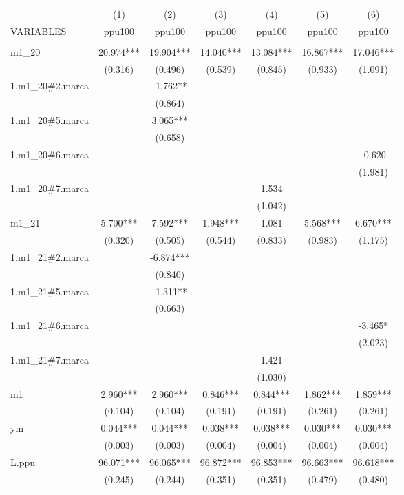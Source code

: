 \begin{tabular}{lcccccc} \hline
 & (1) & (2) & (3) & (4) & (5) & (6) \\
VARIABLES & ppu100 & ppu100 & ppu100 & ppu100 & ppu100 & ppu100 \\ \hline
 &  &  &  &  &  &  \\
m1\_20 & 20.974*** & 19.904*** & 14.040*** & 13.084*** & 16.867*** & 17.046*** \\
& (0.316) & (0.496) & (0.539) & (0.845) & (0.933) & (1.091) \\
1.m1\_20\#2.marca &  & -1.762** &  &  &  &  \\
 &  & (0.864) &  &  &  &  \\
1.m1\_20\#5.marca &  & 3.065*** &  &  &  &  \\
 &  & (0.658) &  &  &  &  \\
1.m1\_20\#6.marca &  &  &  &  &  & -0.620 \\
&  &  &  &  &  & (1.981) \\
1.m1\_20\#7.marca &  &  &  & 1.534 &  &  \\
&  &  &  & (1.042) &  &  \\
m1\_21 & 5.700*** & 7.592*** & 1.948*** & 1.081 & 5.568*** & 6.670*** \\
& (0.320) & (0.505) & (0.544) & (0.833) & (0.983) & (1.175) \\
1.m1\_21\#2.marca &  & -6.874*** &  &  &  &  \\
&  & (0.840) &  &  &  &  \\
1.m1\_21\#5.marca &  & -1.311** &  &  &  &  \\
&  & (0.663) &  &  &  &  \\
1.m1\_21\#6.marca &  &  &  &  &  & -3.465* \\
&  &  &  &  &  & (2.023) \\
1.m1\_21\#7.marca &  &  &  & 1.421 &  &  \\
&  &  &  & (1.030) &  &  \\
m1 & 2.960*** & 2.960*** & 0.846*** & 0.844*** & 1.862*** & 1.859*** \\
 & (0.104) & (0.104) & (0.191) & (0.191) & (0.261) & (0.261) \\
ym & 0.044*** & 0.044*** & 0.038*** & 0.038*** & 0.030*** & 0.030*** \\
 & (0.003) & (0.003) & (0.004) & (0.004) & (0.004) & (0.004) \\
L.ppu & 96.071*** & 96.065*** & 96.872*** & 96.853*** & 96.663*** & 96.618*** \\
 & (0.245) & (0.244) & (0.351) & (0.351) & (0.479) & (0.480) \\

\end{tabular}
